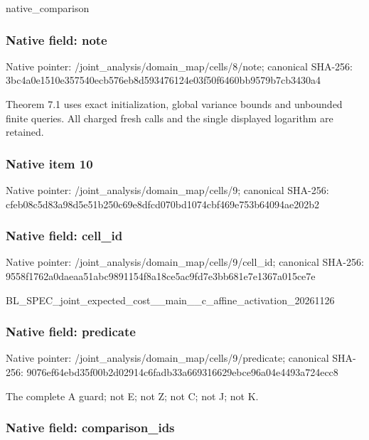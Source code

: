 \documentclass[10pt,a4paper]{article}
\begin{document}
native\_comparison


\subsubsection{Native field: note}


Native pointer: /joint\_analysis/domain\_map/cells/8/note; canonical SHA-256: 3bc4a0e1510e357540ecb576\allowbreak{}eb8d593476124e03f50f6460\allowbreak{}bb9579b7cb3430a4


Theorem 7.1 uses exact initialization, global variance bounds and unbounded finite queries. All charged fresh calls and the single displayed logarithm are retained.


\subsubsection{Native item 10}


Native pointer: /joint\_analysis/domain\_map/cells/9; canonical SHA-256: cfeb08c5d83a98d5e51b250c\allowbreak{}69e8dfcd070bd1074cbf469e\allowbreak{}753b64094ae202b2



\subsubsection{Native field: cell\_id}


Native pointer: /joint\_analysis/domain\_m\allowbreak{}ap/cells/9/cell\_id; canonical SHA-256: 9558f1762a0daeaa51abc989\allowbreak{}1154f8a18ce5ac9fd7e3bb68\allowbreak{}1e7e1367a015ce7e


BL\_SPEC\_joint\_expected\_c\allowbreak{}ost\_\_main\_\_c\_affine\_acti\allowbreak{}vation\_20261126


\subsubsection{Native field: predicate}


Native pointer: /joint\_analysis/domain\_m\allowbreak{}ap/cells/9/predicate; canonical SHA-256: 9076ef64ebd35f00b2d02914\allowbreak{}c6fadb33a669316629ebce96\allowbreak{}a04e4493a724ecc8


The complete A guard; not E; not Z; not C; not J; not K.


\subsubsection{Native field: comparison\_ids}
\end{document}
